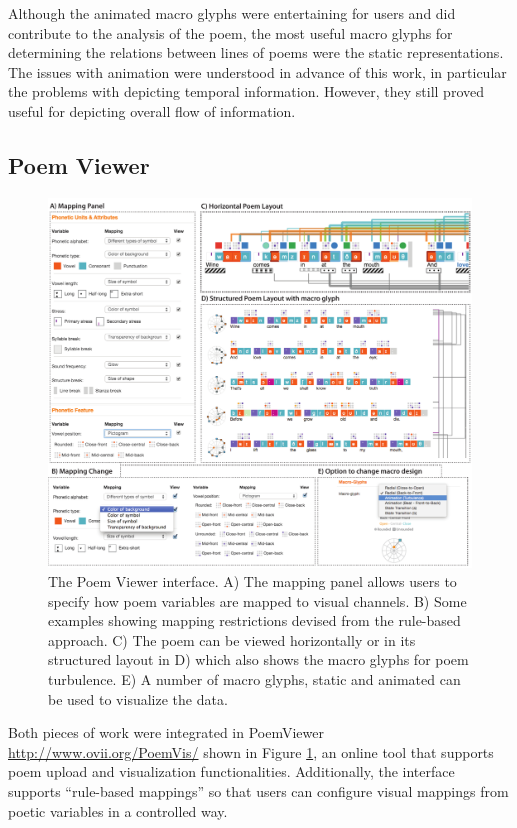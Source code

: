 Although the animated macro glyphs were entertaining for users and did contribute to the analysis of the poem, the most useful macro glyphs for determining the relations between lines of poems were the static representations.
The issues with animation were understood in advance of this work, in particular the problems with depicting temporal information.
However, they still proved useful for depicting overall flow of information. 

\subsection{Poem Viewer}

\begin{figure}[t!]
\centering
\includegraphics[width=\textwidth]{images/other_glyphs/poemview_overview}
\caption{The Poem Viewer interface.
A) The mapping panel allows users to specify how poem variables are mapped to visual channels.
B) Some examples showing mapping restrictions devised from the rule-based approach.
C) The poem can be viewed horizontally or in its structured layout in D) which also shows the macro glyphs for poem turbulence.
E) A number of macro glyphs, static and animated can be used to visualize the data.}
\label{fig:poem_view_overview}
\end{figure}


Both pieces of work were integrated in PoemViewer \url{http://www.ovii.org/PoemVis/} shown in Figure \ref{fig:poem_view_overview}, an online tool that supports poem upload and visualization functionalities.
Additionally, the interface supports ``rule-based mappings'' so that users can configure visual mappings from poetic variables in a controlled way. 

